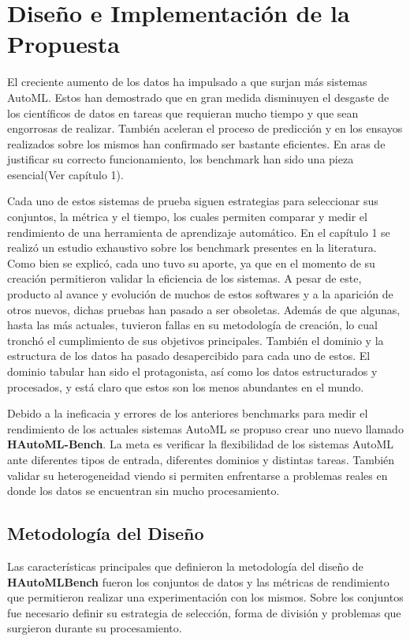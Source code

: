 \chapter{Diseño e Implementación de la Propuesta}\label{chapter:design}
El creciente aumento de los datos ha impulsado a que surjan más sistemas AutoML. Estos han demostrado que en gran medida disminuyen 
el desgaste de los científicos de datos en tareas que requieran mucho tiempo y que sean engorrosas de realizar. También aceleran 
el proceso de predicción y en los ensayos realizados sobre los mismos han confirmado ser bastante eficientes. En aras de justificar 
su correcto funcionamiento, los benchmark han sido una pieza esencial(Ver capítulo 1).

Cada uno de estos sistemas de prueba siguen estrategias para seleccionar sus conjuntos, la métrica y el tiempo, los cuales permiten 
comparar y medir el rendimiento de una herramienta de aprendizaje automático. En el capítulo 1 se realizó un estudio exhaustivo 
sobre los benchmark presentes en la literatura. Como bien se explicó, cada uno tuvo su aporte, ya que en el momento de su creación 
permitieron validar la eficiencia de los sistemas. A pesar de este, producto al avance y evolución de muchos de estos softwares y a 
la aparición de otros nuevos, dichas pruebas han pasado a ser obsoletas. Además de que algunas, hasta las más actuales, tuvieron 
fallas en su metodología de creación, lo cual tronchó el cumplimiento de sus objetivos principales. También el dominio y 
la estructura de los datos ha pasado desapercibido para cada uno de estos. El dominio tabular han sido el protagonista, 
así como los datos estructurados y procesados, y está claro que estos son los menos abundantes en el mundo.

Debido a la ineficacia y errores de los anteriores benchmarks para medir el rendimiento de los actuales sistemas AutoML se propuso 
crear uno nuevo llamado \textbf{HAutoML-Bench}. La meta es verificar la flexibilidad de los sistemas AutoML ante diferentes tipos de entrada, 
diferentes dominios y distintas tareas. También validar su heterogeneidad viendo si permiten enfrentarse a problemas reales en donde 
los datos se encuentran sin mucho procesamiento.

\section{Metodología del Diseño }\label{section:design}

Las características principales que definieron la metodología del diseño de \textbf{HAutoMLBench} fueron los conjuntos de datos y las métricas de 
rendimiento que permitieron realizar una experimentación con los mismos. Sobre los conjuntos fue necesario definir su estrategia de selección,
forma de división y problemas que surgieron durante su procesamiento.

